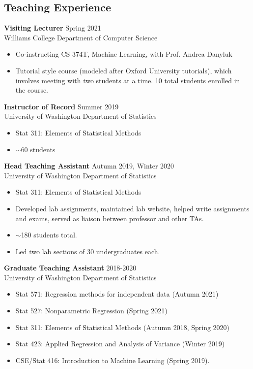 \documentclass[margin, 10pt]{res} %
\begin{document}
\begin{resume}
{\section{Teaching Experience}
{\textbf{Visiting Lecturer}} \hfill Spring 2021 \\
Williams College Department of Computer Science
\begin{itemize}
\item Co-instructing CS 374T, Machine Learning, with Prof. Andrea Danyluk
\item Tutorial style course (modeled after Oxford University tutorials), which involves meeting with two students at a time. 10 total students enrolled in the course. 
\end{itemize}
{\textbf{Instructor of Record}} \hfill Summer 2019 \\
University of Washington Department of Statistics
\begin{itemize}
\item Stat 311: Elements of Statistical Methods
\item $\sim$60 students
\end{itemize}
{\textbf{Head Teaching Assistant}} \hfill Autumn 2019, Winter 2020 \\
University of Washington Department of Statistics
\begin{itemize}
\item Stat 311: Elements of Statistical Methods
\item Developed lab assignments, maintained lab website, helped write assignments and exams, served as liaison between professor and other TAs.  
\item $\sim$180 students total. 
\item Led two lab sections of 30 undergraduates each. 
\end{itemize} 
{\textbf{Graduate Teaching Assistant}} \hfill 2018-2020\\
University of Washington Department of Statistics
\begin{itemize}
\item Stat 571: Regression methods for independent data (Autumn 2021)
\item Stat 527: Nonparametric Regression (Spring 2021)
\item Stat 311: Elements of Statistical Methods (Autumn 2018, Spring 2020)
\item Stat 423:  Applied Regression and Analysis of Variance (Winter 2019)
\item CSE/Stat 416: Introduction to Machine Learning (Spring 2019). 

\end{itemize}}
\end{resume}
\end{document}
